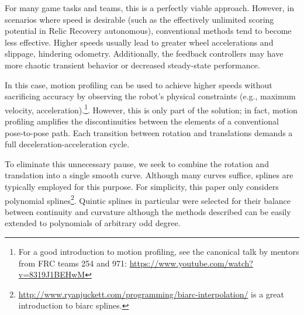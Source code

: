 \documentclass{article}
\begin{document}
For many game tasks and teams, this is a perfectly viable approach. However, in scenarios where speed is desirable (such as the effectively unlimited scoring potential in Relic Recovery autonomous), conventional methods tend to become less effective. Higher speeds usually lead to greater wheel accelerations and slippage, hindering odometry. Additionally, the feedback controllers may have more chaotic transient behavior or decreased steady-state performance. 

In this case, motion profiling can be used to achieve higher speeds without sacrificing accuracy by observing the robot's physical constraints (e.g., maximum velocity, acceleration).\footnote{For a good introduction to motion profiling, see the canonical talk by mentors from FRC teams 254 and 971: \url{https://www.youtube.com/watch?v=8319J1BEHwM}}. However, this is only part of the solution; in fact, motion profiling amplifies the discontinuities between the elements of a conventional pose-to-pose path. Each transition between rotation and translations demands a full deceleration-acceleration cycle.

To eliminate this unnecessary pause, we seek to combine the rotation and translation into a single smooth curve. Although many curves suffice, splines are typically employed for this purpose. For simplicity, this paper only considers polynomial  splines\footnote{\url{http://www.ryanjuckett.com/programming/biarc-interpolation/} is a great introduction to biarc splines.}. Quintic splines in particular were selected for their balance between continuity and curvature although the methods described can be easily extended to polynomials of arbitrary odd degree.
\end{document}
